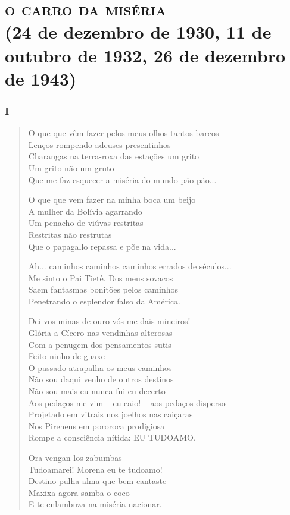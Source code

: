 \part[o carro da miséria]{\textsc{o carro da miséria}\\(24 de dezembro de 1930, 11 de outubro de 1932, 26 de dezembro de 1943)}
\removeepigraph

\section{I}

\begin{verse}
O que que vêm fazer pelos meus olhos tantos barcos\\
Lenços rompendo adeuses presentinhos\\
Charangas na terra-roxa das estações um grito\\
Um grito não um gruto\\
Que me faz esquecer a miséria do mundo pão pão...

O que que vem fazer na minha boca um beijo\\
A mulher da Bolívia agarrando\\
Um penacho de viúvas restritas\\
Restritas não restrutas\\
Que o papagallo repassa e põe na vida...

Ah... caminhos caminhos caminhos errados de séculos...\\
Me sinto o Pai Tietê. Dos meus sovacos\\
Saem fantasmas bonitões pelos caminhos\\
Penetrando o esplendor falso da América.

Dei-vos minas de ouro vós me dais mineiros!\\
Glória a Cícero nas vendinhas alterosas\\
Com a penugem dos pensamentos sutis\\
Feito ninho de guaxe\\
O passado atrapalha os meus caminhos\\
Não sou daqui venho de outros destinos\\
Não sou mais eu nunca fui eu decerto\\
Aos pedaços me vim -- eu caio! -- aos pedaços disperso\\
Projetado em vitrais nos joelhos nas caiçaras\\
Nos Pireneus em pororoca prodigiosa\\
Rompe a consciência nítida: EU TUDOAMO.

Ora vengan los zabumbas\\
Tudoamarei! Morena eu te tudoamo!\\
Destino pulha alma que bem cantaste\\
Maxixa agora samba o coco\\
E te enlambuza na miséria nacionar.
\end{verse}

